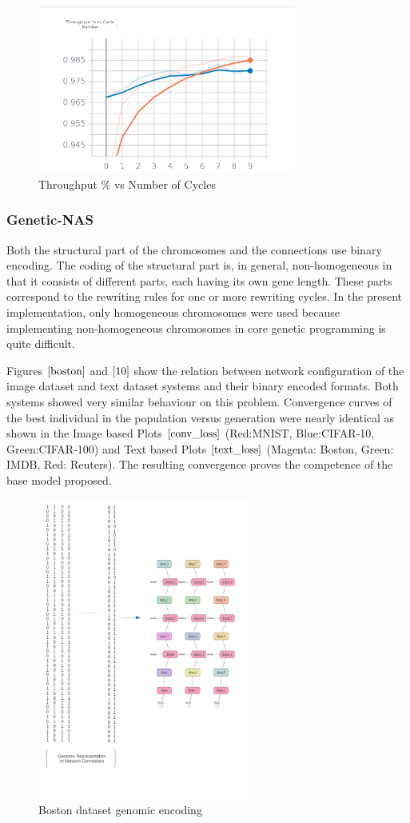 \documentclass[conference]{IEEEtran}
\begin{document}
\begin{figure}[!b]
\centerline{\includegraphics[width=85mm]{throughput_pct.png}}
\caption{Throughput \% vs Number of Cycles}
\label{throughput_pct}
\end{figure}

\subsubsection{Genetic-NAS}

Both the structural part of the chromosomes and the connections use binary encoding. The coding of the structural part is, in general, non-homogeneous in that it consists of different parts, each having its own gene length. These parts correspond to the rewriting rules for one or more rewriting cycles. In the present implementation, only homogeneous chromosomes were used because implementing non-homogeneous chromosomes in core genetic programming is quite difficult. 

Figures $\ref{boston}$ and $\ref{10}$ show the relation between network configuration of the image dataset and text dataset systems and their binary encoded formats. Both systems showed very similar behaviour on this problem. Convergence curves of the best individual in the population versus generation were nearly identical as shown in the Image based Plots $\ref{conv_loss}$ (Red:MNIST, Blue:CIFAR-10, Green:CIFAR-100) and Text based Plots $\ref{text_loss}$ (Magenta: Boston, Green: IMDB, Red: Reuters). The resulting convergence proves the competence of the base model proposed. 
\begin{figure}[!b]
\centerline{\includegraphics[width=70mm]{boston.png}}
\caption{Boston dataset genomic encoding}
\label{boston}
\end{figure}
\end{document}
